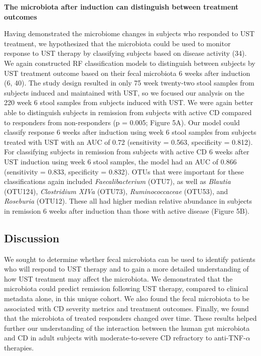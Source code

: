 \documentclass[12pt,]{article}
\begin{document}
\textbf{The microbiota after induction can distinguish between treatment
outcomes}

Having demonstrated the microbiome changes in subjects who responded to
UST treatment, we hypothesized that the microbiota could be used to
monitor response to UST therapy by classifying subjects based on disease
activity (34). We again constructed RF classification models to
distinguish between subjects by UST treatment outcome based on their
fecal microbiota 6 weeks after induction (6, 40). The study design
resulted in only 75 week twenty-two stool samples from subjects induced
and maintained with UST, so we focused our analysis on the 220 week 6
stool samples from subjects induced with UST. We were again better able
to distinguish subjects in remission from subjects with active CD
compared to responders from non-responders (p = 0.005; Figure 5A). Our
model could classify response 6 weeks after induction using week 6 stool
samples from subjects treated with UST with an AUC of 0.72 (sensitivity
= 0.563, specificity = 0.812). For classifying subjects in remission
from subjects with active CD 6 weeks after UST induction using week 6
stool samples, the model had an AUC of 0.866 (sensitivity = 0.833,
specificity = 0.832). OTUs that were important for these classifications
again included \emph{Faecalibacterium} (OTU7), as well as \emph{Blautia}
(OTU124), \emph{Clostridium XIVa} (OTU73), \emph{Ruminococcaceae}
(OTU53), and \emph{Roseburia} (OTU12). These all had higher median
relative abundance in subjects in remission 6 weeks after induction than
those with active disease (Figure 5B).

\subsection{Discussion}\label{discussion}

We sought to determine whether fecal microbiota can be used to identify
patients who will respond to UST therapy and to gain a more detailed
understanding of how UST treatment may affect the microbiota. We
demonstrated that the microbiota could predict remission following UST
therapy, compared to clinical metadata alone, in this unique cohort. We
also found the fecal microbiota to be associated with CD severity
metrics and treatment outcomes. Finally, we found that the microbiota of
treated responders changed over time. These results helped further our
understanding of the interaction between the human gut microbiota and CD
in adult subjects with moderate-to-severe CD refractory to
anti-TNF-\({\alpha}\) therapies.
\end{document}
